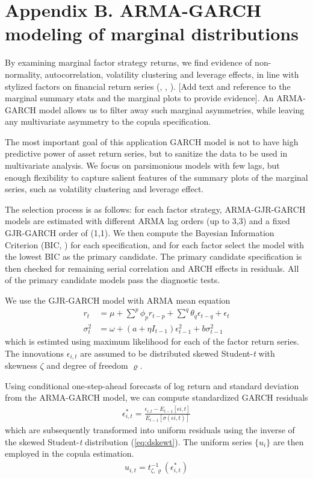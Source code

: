 \newpage
\section{Appendix B. ARMA-GARCH modeling of marginal distributions} \label{App:AppendixB}

By examining marginal factor strategy returns, we find evidence of non-normality, autocorrelation, volatility clustering and leverage effects, in line with stylized factors on financial return series (\textcite{Bollerslev1986}, \textcite{Black1976}, \textcite{glosten1993relation}). [Add text and reference to the marginal summary stats and the marginal plots to provide evidence]. An ARMA-GARCH model allows us to filter away such marginal asymmetries, while leaving any multivariate asymmetry to the copula specification. 

The most important goal of this application GARCH model is not to have high predictive power of asset return series, but to sanitize the data to be used in multivariate analysis. We focus on parsimonious models with few lags, but enough flexibility to capture salient features of the summary plots of the marginal series, such as volatility clustering and leverage effect.

The selection process is as follows: for each factor strategy, ARMA-GJR-GARCH models are estimated with different ARMA lag orders (up to 3,3) and a fixed GJR-GARCH order of (1,1). We then compute the Bayesian Information Criterion (BIC, \textcite{Schwarz1978}) for each specification, and for each factor select the model with the lowest BIC as the primary candidate. The primary candidate specification is then checked for remaining serial correlation and ARCH effects in residuals. All of the primary candidate models pass the diagnostic tests.

We use the GJR-GARCH model with ARMA mean equation
\begin{align}
    r_t &= \mu + \sum^p \phi_p r_{t-p} + \sum^q \theta_q \epsilon_{t-q} + \epsilon_{t}  \\
    \sigma_{t}^2 &= \omega + (a + \eta I_{t-1}) \epsilon_{t-1}^2 + b \sigma^2_{t-1}
\end{align}
which is estimted using maximum likelihood for each of the factor return series. The innovations $\epsilon_{i,t}$ are assumed to be distributed skewed Student-\textit{t} with skewness $\zeta$ and degree of freedom $\varrho$.

Using conditional one-step-ahead forecasts of log return and standard deviation from the ARMA-GARCH model, we can compute standardized GARCH residuals
\begin{align}
    \epsilon^*_{i,t} = \frac{\epsilon_{i,t} - E_{t-1}[\epsilon{i,t}]}{E_{t-1}[\sigma(\epsilon{i,t})]}
\end{align}
which are subsequently transformed into uniform residuals using the inverse of the skewed Student-\textit{t} distribution (\autoref{eq:dskewt}). The uniform series $\{u_i\}$ are then employed in the copula estimation.
\begin{align}
    u_{i,t} = t^{-1}_{\zeta, \varrho}(\epsilon^*_{i,t})
\end{align}

